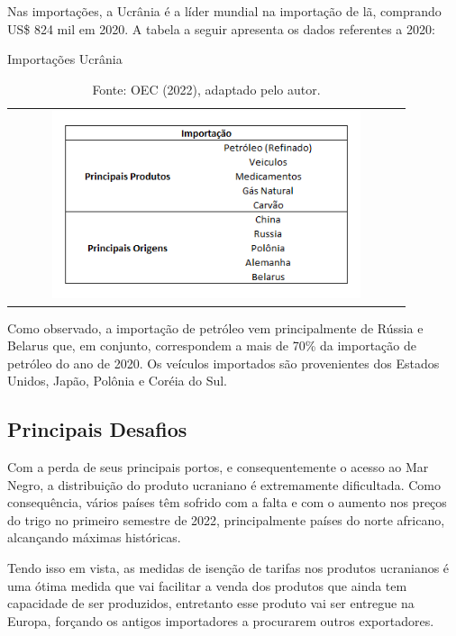 \documentclass[12pt]{article}
\begin{document}
Nas importações, a Ucrânia é a líder mundial na importação de lã, comprando US\$ 824 mil em 2020. A tabela a seguir apresenta os dados referentes a 2020:

\begin{table}[H]
    \begin{center}
        \caption{Importações Ucrânia}
        \begin{tabular}{c}
            \includegraphics[width=0.8\textwidth]{imp ukr.png}
        \end{tabular}
        \caption*{Fonte: OEC (2022), adaptado pelo autor.}
        \label{expukr}
    \end{center}
\end{table}

Como observado, a importação de petróleo vem principalmente de Rússia e Belarus que, em conjunto, correspondem a mais de 70\% da importação de petróleo do ano de 2020. Os veículos importados são provenientes dos Estados Unidos, Japão, Polônia e Coréia do Sul. 

\subsection{Principais Desafios}

Com a perda de seus principais portos, e consequentemente o acesso ao Mar Negro, a distribuição do produto ucraniano é extremamente dificultada. Como consequência, vários países têm sofrido com a falta e com o aumento nos preços do trigo no primeiro semestre de 2022, principalmente países do norte africano, alcançando máximas históricas.
 
Tendo isso em vista, as medidas de isenção de tarifas nos produtos ucranianos é uma ótima medida que vai facilitar a venda dos produtos que ainda tem capacidade de ser produzidos, entretanto esse produto vai ser entregue na Europa, forçando os antigos importadores a procurarem outros exportadores. 
\pagebreak
\end{document}
